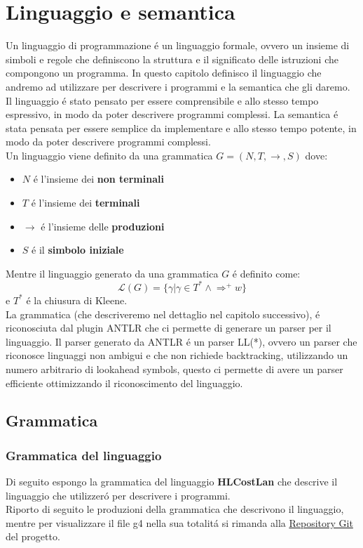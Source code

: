\documentclass[../../main.tex]{subfiles}
\begin{document}
\chapter{Linguaggio e semantica}
Un linguaggio di programmazione é un linguaggio formale, ovvero un insieme di simboli e regole che definiscono la struttura e il significato delle istruzioni che compongono un programma.
In questo capitolo definisco il linguaggio che andremo ad utilizzare per descrivere i programmi e la semantica che gli daremo. Il linguaggio é stato pensato per essere comprensibile e allo stesso tempo espressivo, in modo da poter descrivere programmi complessi. La semantica é stata pensata per essere semplice da implementare e allo stesso tempo potente, in modo da poter descrivere programmi complessi.\\
Un linguaggio viene definito da una grammatica $G = (N, T ,\rightarrow, S)$ dove:
\begin{itemize}
    \item $N$ é l'insieme dei \textbf{non terminali}
    \item $T$ é l'insieme dei \textbf{terminali}
    \item $\rightarrow$ é l'insieme delle \textbf{produzioni}
    \item $S$ é il \textbf{simbolo iniziale}
\end{itemize}

Mentre il linguaggio generato da una grammatica $G$ é definito come:
\begin{equation}
    \mathcal{L}(G) = \{\gamma | \gamma \in T^* \land \Rightarrow^+ w\}
\end{equation}
e $T^*$ é la chiusura di Kleene.\\
La grammatica (che descriveremo nel dettaglio nel capitolo successivo), é riconosciuta dal plugin ANTLR che ci permette di generare un parser per il linguaggio. Il parser generato da ANTLR é un parser LL(*), ovvero un parser che riconosce linguaggi non ambigui e che non richiede backtracking, utilizzando un numero arbitrario di lookahead symbols, questo ci permette di avere un parser efficiente ottimizzando il riconoscimento del linguaggio.

\section{Grammatica}

\subsection{Grammatica del linguaggio}
Di seguito espongo la grammatica del linguaggio \textbf{HLCostLan} che descrive il linguaggio che utilizzeró per descrivere i programmi.\\
Riporto di seguito le produzioni della grammatica che descrivono il linguaggio, mentre per visualizzare il file g4 nella sua totalitá si rimanda alla \href{https://github.com/minosse99/CostCompiler/blob/master/src/HLCostLan.g4}{Repository Git} del progetto.\\
\label{sec:grammatica}
\end{document}
